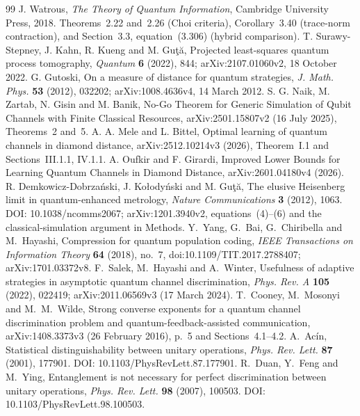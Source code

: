 \begin{thebibliography}{99}
 J. Watrous, \emph{The Theory of Quantum Information},
Cambridge University Press, 2018. Theorems~2.22 and~2.26
(Choi criteria), Corollary~3.40 (trace-norm contraction),
and Section~3.3, equation~(3.306) (hybrid comparison).
 T. Surawy-Stepney, J. Kahn, R. Kueng and M. Gu\c{t}\u{a},
Projected least-squares quantum process tomography,
\emph{Quantum} \textbf{6} (2022), 844;
arXiv:2107.01060v2, 18 October 2022.
 G. Gutoski,
On a measure of distance for quantum strategies,
\emph{J. Math. Phys.} \textbf{53} (2012), 032202;
arXiv:1008.4636v4, 14 March 2012.
 S. G. Naik, M. Zartab, N. Gisin and M. Banik,
No-Go Theorem for Generic Simulation of Qubit Channels with Finite
Classical Resources, arXiv:2501.15807v2 (16 July 2025),
Theorems~2 and~5.
 A. A. Mele and L. Bittel,
Optimal learning of quantum channels in diamond distance,
arXiv:2512.10214v3 (2026), Theorem~I.1 and Sections~III.1.1, IV.1.1.
 A. Oufkir and F. Girardi,
Improved Lower Bounds for Learning Quantum Channels in Diamond
Distance, arXiv:2601.04180v4 (2026).
 R. Demkowicz-Dobrza\'nski, J. Ko\l ody\'nski
and M. Gu\c{t}\u{a}, The elusive Heisenberg limit in quantum-enhanced
metrology, \emph{Nature Communications} \textbf{3} (2012), 1063.
DOI: 10.1038/ncomms2067; arXiv:1201.3940v2, equations~(4)--(6)
and the classical-simulation argument in Methods.
 Y.~Yang, G.~Bai, G.~Chiribella and M.~Hayashi,
Compression for quantum population coding,
\emph{IEEE Transactions on Information Theory} \textbf{64} (2018), no.~7,
doi:10.1109/TIT.2017.2788407;
arXiv:1701.03372v8.
 F.~Salek, M.~Hayashi and A.~Winter,
Usefulness of adaptive strategies in asymptotic quantum channel
 discrimination, \emph{Phys. Rev. A} \textbf{105} (2022), 022419;
arXiv:2011.06569v3 (17 March 2024).
 T.~Cooney, M.~Mosonyi and M.~M.~Wilde,
Strong converse exponents for a quantum channel discrimination problem
and quantum-feedback-assisted communication,
arXiv:1408.3373v3 (26 February 2016), p.~5 and Sections~4.1--4.2.
 A.~Ac\'in,
Statistical distinguishability between unitary operations,
\emph{Phys. Rev. Lett.} \textbf{87} (2001), 177901.
DOI: 10.1103/PhysRevLett.87.177901.
 R.~Duan, Y.~Feng and M.~Ying,
Entanglement is not necessary for perfect discrimination between
unitary operations, \emph{Phys. Rev. Lett.} \textbf{98} (2007), 100503.
DOI: 10.1103/PhysRevLett.98.100503.


\end{thebibliography}
